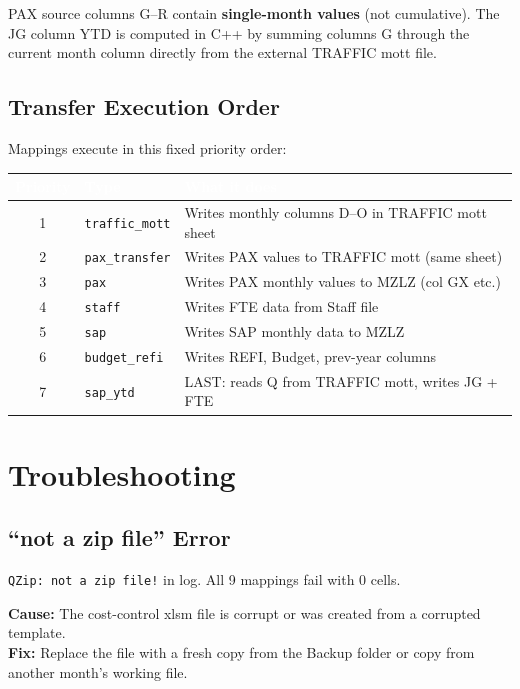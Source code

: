 \documentclass[11pt,a4paper]{article}
\begin{document}
\begin{infobox}
PAX source columns G--R contain \textbf{single-month values} (not cumulative). The JG column YTD is computed in C++ by summing columns G through the current month column directly from the external TRAFFIC mott file.
\end{infobox}

\subsection{Transfer Execution Order}

Mappings execute in this fixed priority order:

\begin{center}
\begin{tabularx}{0.88\linewidth}{@{} c l X @{}}
\toprule
\rowcolor{PrimaryBlue}
\textcolor{White}{\textbf{Priority}} & \textcolor{White}{\textbf{Type}} & \textcolor{White}{\textbf{What it does}} \\
\midrule
1 & \texttt{traffic\_mott} & Writes monthly columns D--O in TRAFFIC mott sheet \\
2 & \texttt{pax\_transfer} & Writes PAX values to TRAFFIC mott (same sheet) \\
3 & \texttt{pax}           & Writes PAX monthly values to MZLZ (col GX etc.) \\
4 & \texttt{staff}         & Writes FTE data from Staff file \\
5 & \texttt{sap}           & Writes SAP monthly data to MZLZ \\
6 & \texttt{budget\_refi}  & Writes REFI, Budget, prev-year columns \\
7 & \texttt{sap\_ytd}      & LAST: reads Q from TRAFFIC mott, writes JG + FTE \\
\bottomrule
\end{tabularx}
\end{center}

\newpage  %

\section{Troubleshooting}

\subsection{``not a zip file'' Error}
\begin{warningbox}[Symptom]
\texttt{QZip: not a zip file!} in log. All 9 mappings fail with 0 cells.
\end{warningbox}
\textbf{Cause:} The cost-control xlsm file is corrupt or was created from a corrupted template.\\
\textbf{Fix:} Replace the file with a fresh copy from the Backup folder or copy from another month's working file.
\end{document}
